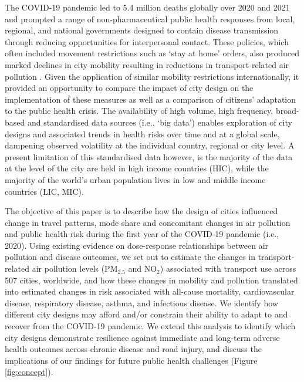 \documentclass[preprint,10pt]{elsarticle} %
\begin{document}
The COVID-19 pandemic led to 5.4 million deaths globally over 2020 and 2021 \cite{Taylor2022} and prompted a range of non-pharmaceutical public health responses from local, regional, and national governments\cite{Hunter2023LPH} designed to contain disease transmission through reducing opportunities for interpersonal contact. These policies, which often included movement restrictions such as `stay at home' orders, also produced marked declines in city mobility resulting in reductions in transport-related air pollution \cite{Forster2020,He2020,LeQuere2020,Venter2020}. Given the application of similar mobility restrictions internationally, it provided an opportunity to compare the impact of city design on the implementation of these measures as well as a comparison of citizens' adaptation to the public health crisis. The availability of high volume, high frequency, broad-based and standardised data sources (i.e., `big data') enables exploration of city designs and associated trends in health risks over time and at a global scale, dampening observed volatility at the individual country, regional or city level. A present limitation of this standardised data however, is the majority of the data at the level of the city are held in high income countries (HIC), while the majority of the world's urban population lives in low and middle income countries (LIC, MIC)\cite{Smit2021}.

The objective of this paper is to describe how the design of cities influenced change in travel patterns, mode share and concomitant changes in air pollution and public health risk during the first year of the COVID-19 pandemic (i.e., 2020). Using existing evidence on dose-response relationships between air pollution and disease outcomes, we set out to estimate the changes in transport-related air pollution levels (PM$_{2.5}$ and NO$_{2}$) associated with transport use across 507 cities, worldwide, and how these changes in mobility and pollution translated into estimated changes in risk associated with all-cause mortality, cardiovascular disease, respiratory disease, asthma, and infectious disease. We identify how different city designs may afford and/or constrain their ability to adapt to and recover from the COVID-19 pandemic. We extend this analysis to identify which city designs demonstrate resilience against immediate and long-term adverse health outcomes across chronic disease and road injury, and discuss the implications of our findings for future public health challenges (Figure \ref{fig:concept}).
\end{document}

